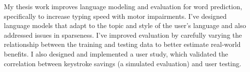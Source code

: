 My thesis work improves language modeling and evaluation for word prediction, specifically to increase typing speed with motor impairments.
I've designed language models that adapt to the topic and style of the user's language and also addressed issues in sparseness.
I've improved evaluation by carefully varying the relationship between the training and testing data to better estimate real-world benefits.
I also designed and implemented a user study, which validated the correlation between keystroke savings (a simulated evaluation) and user testing.